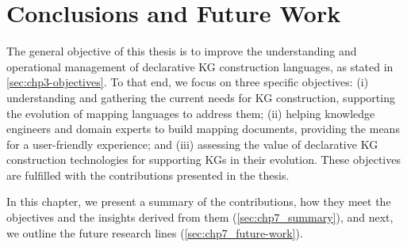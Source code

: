 \chapter{Conclusions and Future Work}
\label{chapter:conclusions}

%

The general objective of this thesis is to improve the understanding and operational management of declarative KG construction languages, as stated in \cref{sec:chp3-objectives}. To that end, we focus on three specific objectives: (i) understanding and gathering the current needs for KG construction, supporting the evolution of mapping languages to address them; (ii) helping knowledge engineers and domain experts to build mapping documents, providing the means for a user-friendly experience; and (iii) assessing the value of declarative KG construction technologies for supporting KGs in their evolution. These objectives are fulfilled with the contributions presented in the thesis.

In this chapter, we present a summary of the contributions, how they meet the objectives and the insights derived from them (\cref{sec:chp7_summary}), and next, we outline the future research lines (\cref{sec:chp7_future-work}). 

